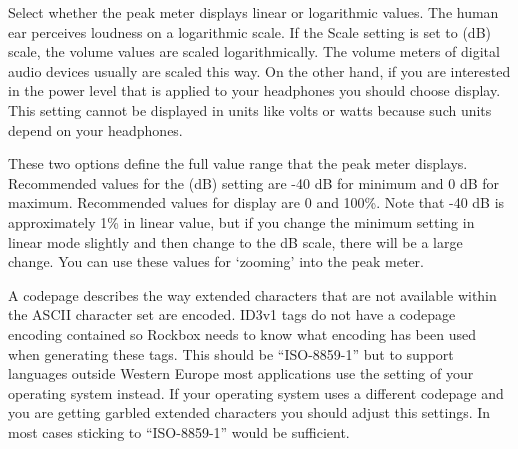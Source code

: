 \begin{description}
{\begin{description}
        Select whether the peak meter displays linear or logarithmic values.
        The human ear perceives loudness on a logarithmic scale. If the Scale
        setting is set to  (dB) scale, the volume values
        are scaled logarithmically. The volume meters of digital audio
        devices usually are scaled this way. On the other hand, if you
        are interested in the power level that is applied to your headphones
        you should choose  display. This setting cannot be
        displayed in units like volts or watts because such units depend
        on your headphones.
      \item[Minimum and maximum range.]
        These two options define the full value range that the peak meter
        displays. Recommended values for the  (dB) setting
        are {}-40 dB for minimum and 0 dB for maximum. Recommended values
        for  display are 0 and 100\%. Note that {}-40 dB is
        approximately 1\% in linear value, but if you change the minimum
        setting in linear mode slightly and then change to the dB scale,
        there will be a large change. You can use these values for `zooming'
        into the peak meter.
      \end{description}
    }
    \item[\label{ref:Defaultcodepage}Default Codepage.]
      A codepage describes the way extended characters that are not available
      within the ASCII character set are encoded. ID3v1 tags do not have a
      codepage encoding contained so Rockbox needs to know what encoding has
      been used when generating these tags. This should be ``ISO-8859-1'' but
      to support languages outside Western Europe most applications use
      the setting of your operating system instead. If your operating system
      uses a different codepage and you are getting garbled extended characters
      you should adjust this settings. In most cases sticking to
      ``ISO-8859-1'' would be sufficient.
  \end{description}
